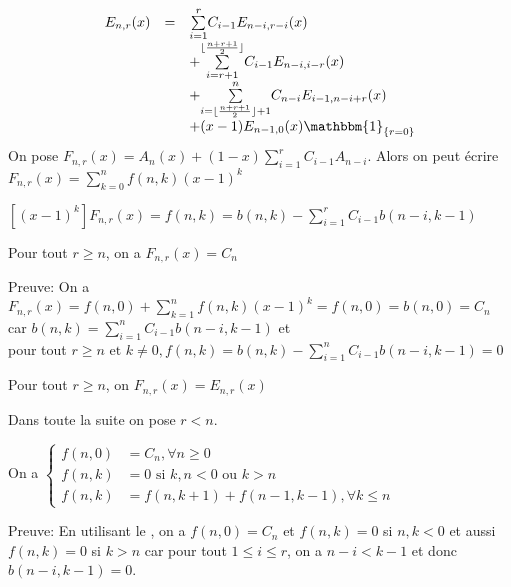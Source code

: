 \begin{equation} \label{eq:Enr}
	\begin{array}{l l l}
		E_{n,r}(x) & =       & \underset{i=1}{\overset{r}{\sum}}C_{i-1}E_{n-i,r-i}(x)                                    \\
		           & \text{} & +\underset{i=r+1}{\overset{\lfloor \frac{n+r+1}{2}\rfloor}{\sum}}C_{i-1}E_{n-i,i-r}(x)    \\
		           & \text{} & +\underset{i=\lfloor \frac{n+r+1}{2}\rfloor +1}{\overset{n}{\sum}}C_{n-i}E_{i-1,n-i+r}(x) \\
		           & \text{} & +(x-1)E_{n-1,0}(x)\mathbbm{1}_{\{r=0\}}
	\end{array}
\end{equation}
On pose $F_{n, r}(x)=A_{n}(x) + (1-x)\sum\limits_{i=1}^{r}C_{i-1}A_{n-i}$. Alors on peut écrire $F_{n, r}(x)=\sum\limits_{k=0}^{n}f(n, k)(x-1)^{k}$\\
\begin{lemme}\label{l101}
	$[(x-1)^{k}]F_{n, r}(x)=f(n, k) = b(n, k) - \sum\limits_{i=1}^{r}C_{i-1}b(n-i, k-1)$
\end{lemme}
\begin{proposition}\label{p9}
	Pour tout $r\geq n$, on a $F_{n, r}(x)=C_{n}$
\end{proposition}
Preuve: On a $F_{n, r}(x) = f(n, 0) + \sum\limits_{k=1}^{n}f(n, k)(x-1)^{k} = f(n, 0) =b(n, 0)=C_{n}$ \\car $b(n, k) = \sum\limits_{i=1}^{n}C_{i-1}b(n-i, k-1)$ et\\
pour tout $r\geq n \text{ et } k\neq 0, f(n, k) = b(n, k) - \sum\limits_{i=1}^{n}C_{i-1}b(n-i, k-1)=0$
\begin{corollaire} \label{c100}
	Pour tout $r\geq n$, on $F_{n, r}(x) = E_{n, r}(x)$
\end{corollaire}
Dans toute la suite on pose $r<n$.
\begin{proposition}\label{p10}
	On a $\begin{cases}
			f(n, 0) & = C_{n}, \forall n \geq 0                  \\
			f(n, k) & = 0 \text{ si }k, n <0 \text{ ou }k>n      \\
			f(n, k) & = f(n, k+1) + f(n-1, k-1), \forall k\leq n
		\end{cases}$
\end{proposition}
Preuve: En utilisant le , on a $f(n, 0)=C_{n}$ et $f(n, k) = 0$ si $n, k <0$ et aussi $f(n, k)=0$ si $k>n$ car pour tout $1\leq i\leq r$, on a $n-i<k-1$ et donc $b(n-i, k-1)=0$.\\
